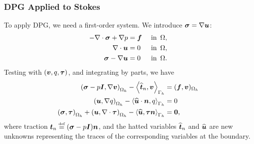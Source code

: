 \documentclass[mathserif]{beamer}
\newcommand{\eqdef}{\stackrel{\text{\tiny def}}{=}}
\newcommand{\NVRvect}[1]{\ensuremath\boldsymbol{#1}}
\newcommand{\vect}[1]{\ensuremath\boldsymbol{#1}}
\newcommand{\NVRtensor}[1]{\NVRvect{#1}}
\newcommand{\NVRgrad}{\nabla}
\newcommand{\NVRdiv}{\NVRgrad \cdot}
\begin{document}
\begin{frame}
\frametitle{DPG Applied to Stokes}

To apply DPG, we need a first-order system.  We introduce $\NVRtensor{\sigma}= \NVRgrad
\vect{u}$:
\begin{align*}
- \NVRdiv \NVRtensor{\sigma} + \NVRgrad p &= \vect{f} & \text{ in } \, \Omega, \\
 \NVRdiv \vect{u} &= 0 & \text{ in } \, \Omega, \\
 \NVRtensor{\sigma} - \NVRgrad \vect{u} &= 0 & \text{ in } \, \Omega.
\end{align*}
Testing with $(\vect{v},q,\vect{\tau})$, and integrating by parts, we have
\begin{align*}
\left(\NVRtensor{\sigma} - p \NVRtensor{I}, \NVRgrad \vect{v} \right)_{\Omega_{h}} - \left\langle \widehat{\vect{t}}_{n}, \vect{v} \right\rangle_{\Gamma_{h}} &= (\vect{f}, \vect{v} )_{\Omega_{h}}\\
\left(\vect{u}, \NVRgrad q \right)_{\Omega_{h}} -  \left\langle \widehat{\vect{u}} \cdot \vect{n}, q  \right\rangle_{\Gamma_{h}} &= 0\\
\left( \NVRtensor{\sigma}, \NVRtensor{\tau} \right)_{\Omega_{h}} + \left( \vect{u}, \NVRdiv \NVRtensor{\tau} \right)_{\Omega_{h}} - \left\langle \widehat{\vect{u}}, \NVRtensor{\tau} \vect{n}  \right\rangle_{\Gamma_{h}} &= \NVRtensor{0},
\end{align*}
where traction $\vect{t}_{n} \eqdef ( \NVRtensor{\sigma} - p \NVRtensor{I} ) \vect{n}$, and the hatted variables $\widehat{\vect{t}}_{n}$ and $\widehat{\vect{u}}$ are new unknowns representing the traces of the corresponding variables at the boundary.

\end{frame}
\end{document}

